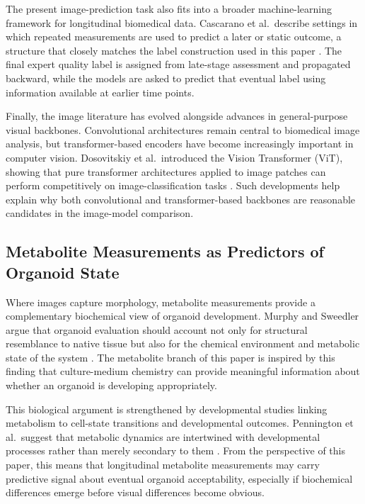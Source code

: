 \documentclass{article}
\begin{document}
The present image-prediction task also fits into a broader machine-learning framework for longitudinal biomedical data. Cascarano et al.\ describe settings in which repeated measurements are used to predict a later or static outcome, a structure that closely matches the label construction used in this paper \cite{cascarano2023}. The final expert quality label is assigned from late-stage assessment and propagated backward, while the models are asked to predict that eventual label using information available at earlier time points.

Finally, the image literature has evolved alongside advances in general-purpose visual backbones. Convolutional architectures remain central to biomedical image analysis, but transformer-based encoders have become increasingly important in computer vision. Dosovitskiy et al.\ introduced the Vision Transformer (ViT), showing that pure transformer architectures applied to image patches can perform competitively on image-classification tasks \cite{dosovitskiy2021}. Such developments help explain why both convolutional and transformer-based backbones are reasonable candidates in the image-model comparison.

\subsection{Metabolite Measurements as Predictors of Organoid State}

Where images capture morphology, metabolite measurements provide a complementary biochemical view of organoid development. Murphy and Sweedler argue that organoid evaluation should account not only for structural resemblance to native tissue but also for the chemical environment and metabolic state of the system \cite{murphy2022}. The metabolite branch of this paper is inspired by this finding that culture-medium chemistry can provide meaningful information about whether an organoid is developing appropriately.

This biological argument is strengthened by developmental studies linking metabolism to cell-state transitions and developmental outcomes. Pennington et al.\ suggest that metabolic dynamics are intertwined with developmental processes rather than merely secondary to them \cite{pennington2025}. From the perspective of this paper, this means that longitudinal metabolite measurements may carry predictive signal about eventual organoid acceptability, especially if biochemical differences emerge before visual differences become obvious.
\end{document}
